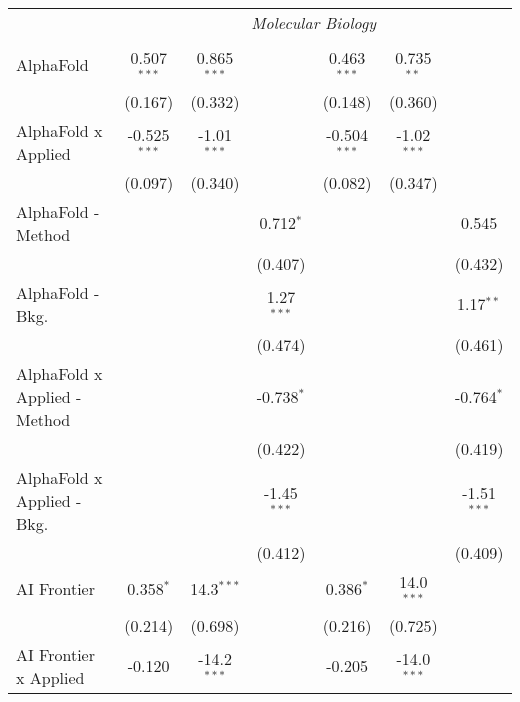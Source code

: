 \begin{tabular}{lcccccc}
 & \multicolumn{6}{c}{\textit{Molecular Biology}} \\ \\
   AlphaFold                      & 0.507$^{***}$  & 0.865$^{***}$ &               & 0.463$^{***}$  & 0.735$^{**}$  &   \\   
                                  & (0.167)        & (0.332)       &               & (0.148)        & (0.360)       &   \\   
   AlphaFold x Applied            & -0.525$^{***}$ & -1.01$^{***}$ &               & -0.504$^{***}$ & -1.02$^{***}$ &   \\   
                                  & (0.097)        & (0.340)       &               & (0.082)        & (0.347)       &   \\   
   AlphaFold - Method             &                &               & 0.712$^{*}$   &                &               & 0.545\\   
                                  &                &               & (0.407)       &                &               & (0.432)\\   
   AlphaFold - Bkg.               &                &               & 1.27$^{***}$  &                &               & 1.17$^{**}$\\   
                                  &                &               & (0.474)       &                &               & (0.461)\\   
   AlphaFold x Applied - Method   &                &               & -0.738$^{*}$  &                &               & -0.764$^{*}$\\   
                                  &                &               & (0.422)       &                &               & (0.419)\\   
   AlphaFold x Applied - Bkg.     &                &               & -1.45$^{***}$ &                &               & -1.51$^{***}$\\   
                                  &                &               & (0.412)       &                &               & (0.409)\\   
   AI Frontier                    & 0.358$^{*}$    & 14.3$^{***}$  &               & 0.386$^{*}$    & 14.0$^{***}$  &   \\   
                                  & (0.214)        & (0.698)       &               & (0.216)        & (0.725)       &   \\   
   AI Frontier x Applied          & -0.120         & -14.2$^{***}$ &               & -0.205         & -14.0$^{***}$ &   \\   

\end{tabular}
